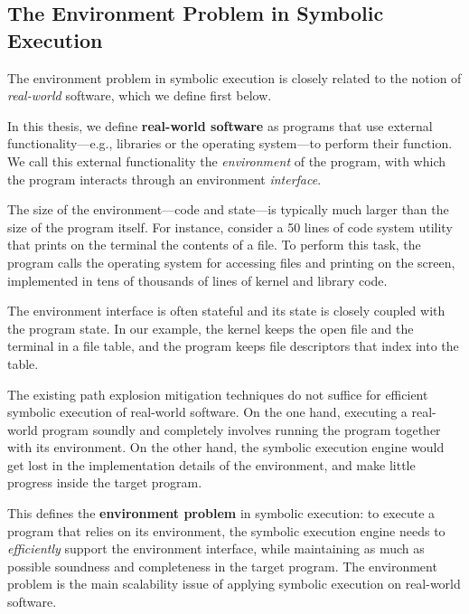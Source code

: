 \subsection{The Environment Problem in Symbolic Execution}

The environment problem in symbolic execution is closely related to the notion of \emph{real-world} software, which we define first below.

\begin{framed}
  In this thesis, we define \textbf{real-world software} as programs that use external functionality---e.g., libraries or the operating system---to perform their function.
  We call this external functionality the \emph{environment} of the program, with which the program interacts through an environment \emph{interface}.
\end{framed}

The size of the environment---code and state---is typically much larger than the size of the program itself.
%
For instance, consider a 50 lines of code system utility that prints on the terminal the contents of a file.  To perform this task, the program calls the operating system for accessing files and printing on the screen, implemented in tens of thousands of lines of kernel and library code.

The environment interface is often stateful and its state is closely coupled with the program state.
%
In our example, the kernel keeps the open file and the terminal in a file table, and the program keeps file descriptors that index into the table.

The existing path explosion mitigation techniques do not suffice for efficient symbolic execution of real-world software.
%
On the one hand, executing a real-world program soundly and completely involves running the program together with its environment.
%
On the other hand, the symbolic execution engine would get lost in the implementation details of the environment, and make little progress inside the target program.

\begin{framed}
  This defines the \textbf{environment problem} in symbolic execution: to execute a program that relies on its environment, the symbolic execution engine needs to \emph{efficiently} support the environment interface, while maintaining as much as possible soundness and completeness in the target program.
  The environment problem is the main scalability issue of applying symbolic execution on real-world software.
\end{framed}

